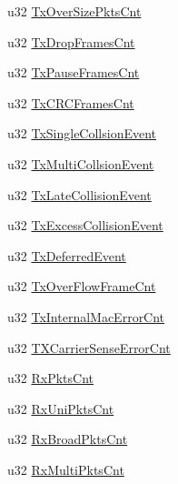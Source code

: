 \begin{DoxyCompactItemize}
\item 
u32 \hyperlink{structECNT__SWITCHMGR__PORT__STATISTICS_a2812e1d8b81904d1628569160a96e311}{Tx\+Over\+Size\+Pkts\+Cnt}
\item 
u32 \hyperlink{structECNT__SWITCHMGR__PORT__STATISTICS_a8f05b42122393c7c489fc5d9beaa8da4}{Tx\+Drop\+Frames\+Cnt}
\item 
u32 \hyperlink{structECNT__SWITCHMGR__PORT__STATISTICS_a6e0cec0056b5576e6d2770e06a131181}{Tx\+Pause\+Frames\+Cnt}
\item 
u32 \hyperlink{structECNT__SWITCHMGR__PORT__STATISTICS_afeb204015982efd96a6316d8a2d0081d}{Tx\+C\+R\+C\+Frames\+Cnt}
\item 
u32 \hyperlink{structECNT__SWITCHMGR__PORT__STATISTICS_a287886bb5032cec40a652e57413f53e8}{Tx\+Single\+Collsion\+Event}
\item 
u32 \hyperlink{structECNT__SWITCHMGR__PORT__STATISTICS_a75a4d5e6b54a8cc630b4028894a1c9b2}{Tx\+Multi\+Collsion\+Event}
\item 
u32 \hyperlink{structECNT__SWITCHMGR__PORT__STATISTICS_a52959b6a9ff7e581068d496e8d425c0f}{Tx\+Late\+Collision\+Event}
\item 
u32 \hyperlink{structECNT__SWITCHMGR__PORT__STATISTICS_ae96586ee79982e02e52e9e7f06ecec6b}{Tx\+Excess\+Collision\+Event}
\item 
u32 \hyperlink{structECNT__SWITCHMGR__PORT__STATISTICS_a989f0fb71d72cb1b4fde1f9da74453e3}{Tx\+Deferred\+Event}
\item 
u32 \hyperlink{structECNT__SWITCHMGR__PORT__STATISTICS_a152262fa18303b62d83fa70f888cc79a}{Tx\+Over\+Flow\+Frame\+Cnt}
\item 
u32 \hyperlink{structECNT__SWITCHMGR__PORT__STATISTICS_af2bfed9c041a21ac7cbc6a573dcfef2d}{Tx\+Internal\+Mac\+Error\+Cnt}
\item 
u32 \hyperlink{structECNT__SWITCHMGR__PORT__STATISTICS_aaaa6433fb06adc0706474d25c43f18e0}{T\+X\+Carrier\+Sense\+Error\+Cnt}
\item 
u32 \hyperlink{structECNT__SWITCHMGR__PORT__STATISTICS_ac4a9fec39c882aa715c581914008bef3}{Rx\+Pkts\+Cnt}
\item 
u32 \hyperlink{structECNT__SWITCHMGR__PORT__STATISTICS_ac1ca55e5a3a1a0b61226e27e395389d6}{Rx\+Uni\+Pkts\+Cnt}
\item 
u32 \hyperlink{structECNT__SWITCHMGR__PORT__STATISTICS_a1a2d6ab2f61aa38a8c39c4b99f433bde}{Rx\+Broad\+Pkts\+Cnt}
\item 
u32 \hyperlink{structECNT__SWITCHMGR__PORT__STATISTICS_a2415386bf538373bee67eb5851ab5e4b}{Rx\+Multi\+Pkts\+Cnt}

\end{DoxyCompactItemize}
